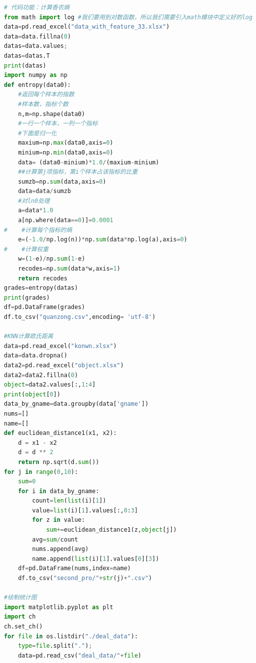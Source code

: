 \documentclass[bwprint]{gmcmthesis}
\begin{document}
\begin{lstlisting}[language=Python]
# 代码功能：计算香农熵
from math import log #我们要用到对数函数，所以我们需要引入math模块中定义好的log函数（对数函数）
data=pd.read_excel("data_with_feature_33.xlsx")
data=data.fillna(0)
datas=data.values;
datas=datas.T
print(datas)
import numpy as np
def entropy(data0):
    #返回每个样本的指数
    #样本数，指标个数
    n,m=np.shape(data0)
    #一行一个样本，一列一个指标
    #下面是归一化
    maxium=np.max(data0,axis=0)
    minium=np.min(data0,axis=0)
    data= (data0-minium)*1.0/(maxium-minium)
    ##计算第j项指标，第i个样本占该指标的比重
    sumzb=np.sum(data,axis=0)
    data=data/sumzb
    #对ln0处理
    a=data*1.0
    a[np.where(data==0)]=0.0001
#    #计算每个指标的熵
    e=(-1.0/np.log(n))*np.sum(data*np.log(a),axis=0)
#    #计算权重
    w=(1-e)/np.sum(1-e)
    recodes=np.sum(data*w,axis=1)
    return recodes
grades=entropy(datas)
print(grades)
df=pd.DataFrame(grades)
df.to_csv("quanzong.csv",encoding= 'utf-8')

#KNN计算欧氏距离
data=pd.read_excel("konwn.xlsx")
data=data.dropna()
data2=pd.read_excel("object.xlsx")
data2=data2.fillna(0)
object=data2.values[:,1:4]
print(object[0])
data_by_gname=data.groupby(data['gname'])
nums=[]
name=[]
def euclidean_distance1(x1, x2):
    d = x1 - x2
    d = d ** 2
    return np.sqrt(d.sum())
for j in range(0,10):
    sum=0
    for i in data_by_gname:
        count=len(list(i)[1])
        value=list(i)[1].values[:,0:3]
        for z in value:
            sum+=euclidean_distance1(z,object[j])
        avg=sum/count
        nums.append(avg)
        name.append(list(i)[1].values[0][3])
    df=pd.DataFrame(nums,index=name)
    df.to_csv("second_pro/"+str(j)+".csv")

#绘制统计图
import matplotlib.pyplot as plt
import ch
ch.set_ch()
for file in os.listdir("./deal_data"):
    type=file.split(".");
    data=pd.read_csv("deal_data/"+file)


\end{lstlisting}
\end{document}
